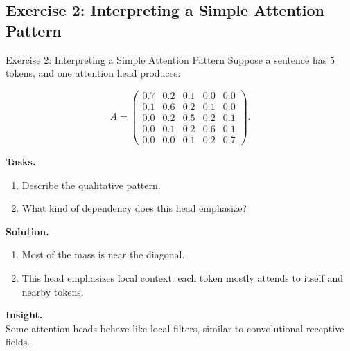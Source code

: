 \documentclass[aspectratio=169,11pt]{beamer}
\begin{document}
\subsection{Exercise 2: Interpreting a Simple Attention Pattern}
\begin{frame}[t,allowframebreaks]{Exercise 2: Interpreting a Simple Attention Pattern}
\small
Suppose a sentence has 5 tokens, and one attention head produces:

\[
A =
\begin{pmatrix}
0.7 & 0.2 & 0.1 & 0.0 & 0.0 \\
0.1 & 0.6 & 0.2 & 0.1 & 0.0 \\
0.0 & 0.2 & 0.5 & 0.2 & 0.1 \\
0.0 & 0.1 & 0.2 & 0.6 & 0.1 \\
0.0 & 0.0 & 0.1 & 0.2 & 0.7
\end{pmatrix}.
\]

\textbf{Tasks.}\\ \begin{enumerate}
    \item Describe the qualitative pattern.
    \item What kind of dependency does this head emphasize?
\end{enumerate}

\textbf{Solution.}\\ \begin{enumerate}
    \item Most of the mass is near the diagonal.

    \item This head emphasizes local context: each token mostly attends to itself and nearby tokens.
\end{enumerate}

\textbf{Insight.}\\ Some attention heads behave like local filters, similar to convolutional receptive fields.
\end{frame}
\end{document}
